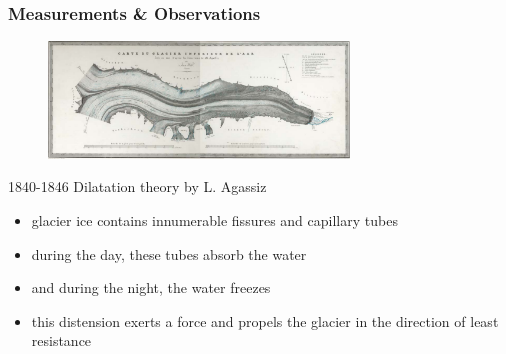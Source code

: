 \documentclass[hide notes,intlimits]{beamer}
\begin{document}
\begin{frame}
  \frametitle{Measurements \& Observations}
  \begin{figure}
    \includegraphics[width=8cm]{figures/agassi}%
  \end{figure}
    \begin{block}{1840-1846 Dilatation theory by L. Agassiz}
      \begin{itemize}
        \item glacier ice contains innumerable fissures and capillary tubes
        \item during the day, these tubes absorb the water
        \item and during the night, the water freezes
        \item this distension exerts a force and propels the glacier in the direction of least resistance
      \end{itemize}
    \end{block}
\end{frame}
\end{document}
